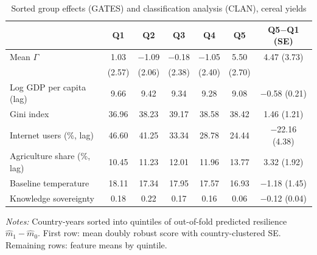 \begin{table}[htbp]
\centering
\caption{Sorted group effects (GATES) and classification analysis (CLAN), cereal yields}\label{tab:gates}
\small
\begin{tabular}{lcccccc}
\toprule
 & Q1 & Q2 & Q3 & Q4 & Q5 & Q5$-$Q1 (SE) \\
\midrule
Mean $\Gamma$ & 1.03 & $-$1.09 & $-$0.18 & $-$1.05 & 5.50 & 4.47 (3.73) \\
 & (2.57) & (2.06) & (2.38) & (2.40) & (2.70) & \\ \midrule
Log GDP per capita (lag) & 9.66 & 9.42 & 9.34 & 9.28 & 9.08 & $-$0.58 (0.21) \\
Gini index & 36.96 & 38.23 & 39.17 & 38.58 & 38.42 & 1.46 (1.21) \\
Internet users (\%, lag) & 46.60 & 41.25 & 33.34 & 28.78 & 24.44 & $-$22.16 (4.38) \\
Agriculture share (\%, lag) & 10.45 & 11.23 & 12.01 & 11.96 & 13.77 & 3.32 (1.92) \\
Baseline temperature & 18.11 & 17.34 & 17.95 & 17.57 & 16.93 & $-$1.18 (1.45) \\
Knowledge sovereignty & 0.18 & 0.22 & 0.17 & 0.16 & 0.06 & $-$0.12 (0.04) \\
\bottomrule
\end{tabular}
\begin{minipage}{0.95\textwidth}\footnotesize\smallskip
\emph{Notes:} Country-years sorted into quintiles of out-of-fold predicted resilience
$\hat m_1-\hat m_0$. First row: mean doubly robust score with country-clustered SE. Remaining rows:
feature means by quintile.
\end{minipage}
\end{table}
